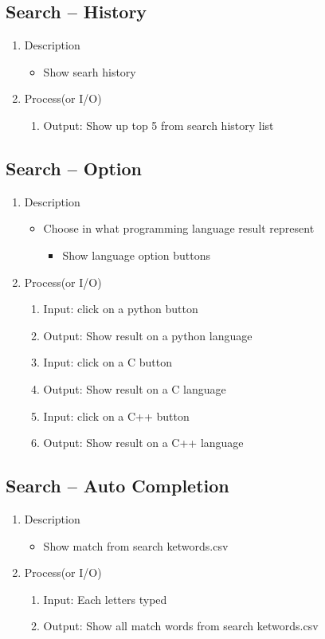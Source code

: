 \documentclass[conference]{IEEEtran}
\begin{document}
\subsection{Search – History}
\begin{enumerate}
\item Description
\begin{itemize}
   \item Show searh history
\end{itemize}
\item Process(or I/O)
  \begin{enumerate}
     \item Output: Show up top 5 from search history list
  \end{enumerate}
\end{enumerate}
\textit{}

\subsection{Search – Option}
\begin{enumerate}
\item Description
\begin{itemize}
  \item Choose in what programming language result represent
  \begin{itemize}
     \item Show language option buttons
  \end{itemize}
\end{itemize}
\item Process(or I/O)
  \begin{enumerate}
    \item Input: click on a python button 
    \item Output: Show result on a python language 
    \item Input: click on a C button 
    \item Output: Show result on a C language 
    \item Input: click on a C++ button 
    \item Output: Show result on a C++ language 
  \end{enumerate}
\end{enumerate}
\textit{}

\subsection{Search – Auto Completion}
\begin{enumerate}
\item Description
\begin{itemize}
  \item Show match from search ketwords.csv
\end{itemize}
\item Process(or I/O)
  \begin{enumerate}
     \item Input: Each letters typed
    \item Output: Show all match words from search ketwords.csv
  \end{enumerate}
\end{enumerate}
\textit{}
\end{document}
